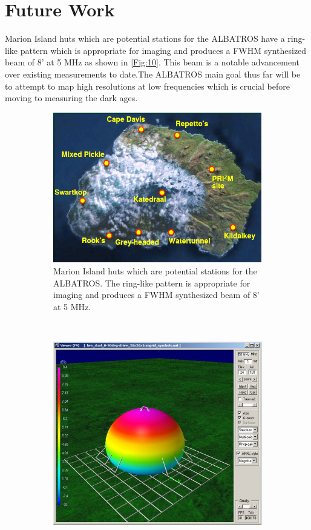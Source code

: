 \documentclass{ws-jai}
\begin{document}
	
	
\section{Future Work}

Marion Island huts which are potential stations for the ALBATROS have a ring-like pattern which is appropriate for imaging and produces a FWHM synthesized beam of 8' at 5 MHz as shown in \autoref{Fig:10}. This beam is a notable advancement over existing measurements to date.The ALBATROS main goal thus far will be to attempt to map high resolutions at low frequencies which is crucial before moving to measuring the dark ages.


\begin{figure}[h]
	\centering
	\begin{subfigure}[t]{0.5\textwidth}
		\centering
		\includegraphics[width=.9\linewidth]{Figures/site.PNG}
		\caption{Marion Island huts which are potential stations for the ALBATROS. The ring-like pattern is appropriate for imaging and produces a FWHM synthesized beam of 8' at 5 MHz.}
		\label{Fig:Marion}
	\end{subfigure}%
	~~~			
	\begin{subfigure}[t]{0.5\textwidth}
		\centering
		\includegraphics[width=.9\linewidth]{Figures/beam.png}

\end{subfigure}
\end{figure}
\end{document}
